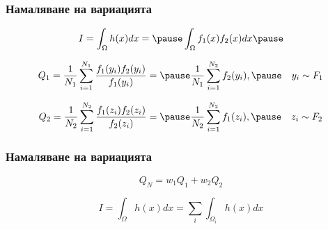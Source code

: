 \begin{frame}
  \frametitle{Намаляване на вариацията}
  \begin{equation*}
  I = \int_{\Omega} h(x) d x = \pause 
  \int_{\Omega} f_1(x) f_2(x) dx \pause
  \end{equation*}

  \begin{equation*}
  Q_1 =  \frac{1}{N_1} \sum_{i=1}^{N_1} \frac{f_1(y_i)f_2(y_i)}{f_1(y_i)} = \pause
   \frac{1}{N_1} \sum_{i=1}^{N_2} f_2(y_i), \pause 
  \quad y_i \sim F_1
  \end{equation*}
  \pause

  \begin{equation*}
  Q_2 =  \frac{1}{N_2} \sum_{i=1}^{N_2} \frac{f_1(z_i)f_2(z_i)}{f_2(z_i)} = \pause
   \frac{1}{N_2} \sum_{i=1}^{N_2} f_1(z_i), \pause
  \quad z_i \sim F_2
  \end{equation*}


\end{frame}
\begin{frame}
  \frametitle{Намаляване на вариацията}
  \begin{equation*}
  Q_{N} = w_1 Q_1 + w_2 Q_2 
  \end{equation*} 
  \pause

  \begin{equation*}
  I = \int_{\Omega} h(x) d x =
  \sum_{i} \int_{\Omega_i} h(x) dx
  \end{equation*}
\end{frame}
